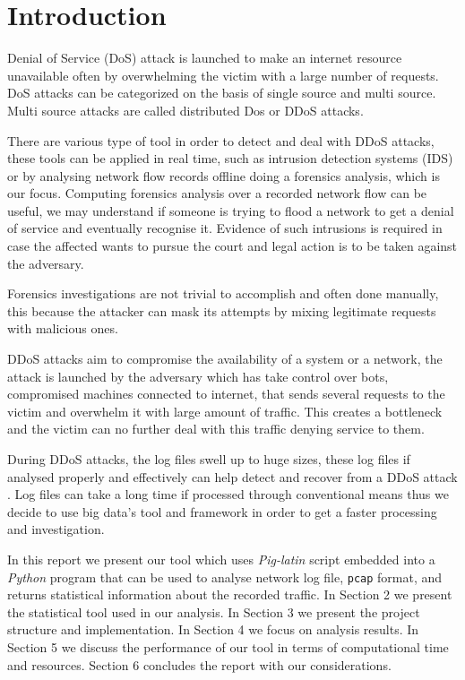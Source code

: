 \section{Introduction}
Denial of Service (DoS) attack is launched to make an internet resource unavailable often by overwhelming the victim with a large number of requests. DoS attacks can be categorized on the basis of single source and multi source. Multi source attacks are called distributed Dos or DDoS attacks\cite{ddos_forensics}.
 
There are various type of tool in order to detect and deal with DDoS attacks, these tools can be applied in real time, such as intrusion detection systems (IDS) or by analysing network flow records offline doing a forensics analysis, which is our focus.
Computing forensics analysis over a recorded network flow can be useful, we may understand if someone is trying to flood a network to get a denial of service and eventually recognise it.
Evidence of such intrusions is required in case the affected wants to pursue the court and legal action is to be taken against the adversary.

Forensics investigations are not trivial to accomplish and often done manually, this because the attacker can mask its attempts by mixing legitimate requests with malicious ones.

DDoS attacks aim to compromise the availability of a system or a network, the attack is launched by the adversary which has take control over bots, compromised machines connected to internet, that sends several requests to the victim and overwhelm it with large amount of traffic. This creates a bottleneck and the victim can no further deal with this traffic denying service to them.

During DDoS attacks, the log files swell up to huge sizes, these log files if analysed properly and effectively can help detect and recover from a DDoS attack \cite{ddos_forensics}. Log files can take a long time if processed through conventional means thus we decide to use big data's tool and framework in order to get a faster processing and investigation.

In this report we present our tool which uses \textit{Pig-latin} script embedded into a \textit{Python} program that can be used to analyse network log file, \texttt{pcap} format\cite{wireshrk_pcap}, and returns statistical information about the recorded traffic. In Section 2 we present the statistical tool used in our analysis. In Section 3 we present the project structure and implementation. In Section 4 we focus on analysis results. In Section 5 we discuss the performance of our tool in terms of computational time and resources. Section 6 concludes the report with our considerations.  